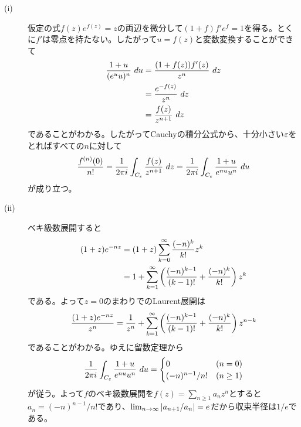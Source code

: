 \begin{sol} ${}$
  \begin{description}
    \item[(i)] 仮定の式$f(z)e^{f(z)} = z$の両辺を微分して$(1 + f)f' e^f = 1$を得る。とくに$f'$は零点を持たない。したがって$u = f(z)$と変数変換することができて
    \begin{align*}
      \frac{1 + u}{ (e^u u)^n} \ du &= \frac{(1 + f(z))f'(z) }{z^n} \ dz \\
      &= \frac{ e^{-f(z)} }{z^n} \ dz \\
      &= \frac{f(z)}{z^{n+1}} \ dz
    \end{align*}
    であることがわかる。したがってCauchyの積分公式から、十分小さい${\varepsilon}$をとればすべての$n$に対して
    \[
\frac{ f^{(n)}(0) }{ n!} =  \frac{1}{2\pi i} \int_{C_{{\varepsilon}}} \frac{f(z)}{z^{n+1}} \ dz  = \frac{1}{2\pi i} \int_{C_{{\varepsilon}}} \frac{1+u}{e^{nu} u^n} \ du
    \]
    が成り立つ。
    \item[(ii)] ベキ級数展開すると
    \begin{align*}
      (1 + z)e^{-nz} &= (1 + z) \sum_{k=0}^{\infty} \frac{ (-n)^k }{k!} z^k \\
      &= 1 + \sum_{k=1}^{\infty} \left( \frac{ (-n)^{k-1} }{ (k-1)! } + \frac{ (-n)^k }{k!} \right) z^{k}
    \end{align*}
    である。よって$z=0$のまわりでのLaurent展開は
    \[
    \frac{ (1 + z)e^{-nz} }{z^n} = \frac{1}{z^n} + \sum_{k=1}^{\infty} \left( \frac{ (-n)^{k-1} }{ (k-1)! } + \frac{ (-n)^k }{k!} \right) z^{n-k}
    \]
    であることがわかる。ゆえに留数定理から
    \[
    \frac{1}{2\pi i} \int_{C_{{\varepsilon}}} \frac{1+u}{e^{nu} u^n} \ du = \begin{cases}
    0 &(n=0) \\
    (-n)^{n-1}/ n! &(n \geq 1)
  \end{cases}
    \]
    が従う。よって$f$のベキ級数展開を$f(z) = \sum_{n \geq 1} a_n z^n$とすると$a_n=(-n)^{n-1}/n!$であり、$\lim_{n \to \infty} \left \lvert a_{n+1} / a_n \right \rvert = e$だから収束半径は$1/e$である。
  \end{description}
\end{sol}

